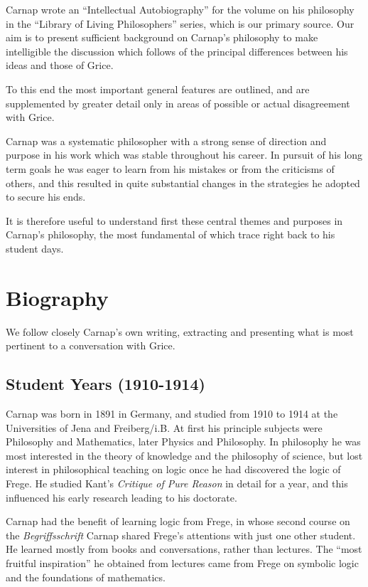 \documentclass[10pt,titlepage]{book}
\begin{document}
Carnap wrote an ``Intellectual Autobiography''\cite{carnap63} for the volume on his philosophy\cite{carnap63a} in the ``Library of Living Philosophers'' series, which is our primary source.
Our aim is to present sufficient background on Carnap's philosophy to make intelligible the discussion which follows of the principal differences between his ideas and those of Grice.

To this end the most important general features are outlined, and are supplemented by greater detail only in areas of possible or actual disagreement with Grice.

Carnap was a systematic philosopher with a strong sense of direction and purpose in his work which was stable throughout his career.
In pursuit of his long term goals he was eager to learn from his mistakes or from the criticisms of others, and this resulted in quite substantial changes in the strategies he adopted to secure his ends.

It is therefore useful to understand first these central themes and purposes in Carnap's philosophy, the most fundamental of which trace right back to his student days.

\section{Biography}

We follow closely Carnap's own writing, extracting and presenting what is most pertinent to a conversation with Grice.

\subsection{Student Years (1910-1914)}

Carnap was born in 1891 in Germany, and studied from 1910 to 1914 at the Universities of Jena and Freiberg/i.B.
At first his principle subjects were Philosophy and Mathematics, later Physics and Philosophy.
In philosophy he was most interested in the theory of knowledge and the philosophy of science, but lost interest in philosophical teaching on logic once he had discovered the logic of Frege.
He studied Kant's \emph{Critique of Pure Reason} in detail for a year, and this influenced his early research leading to his doctorate.

Carnap had the benefit of learning logic from Frege, in whose second course on the {\it Begriffsschrift} Carnap shared Frege's attentions with just one other student.
He learned mostly from books and conversations, rather than lectures.
The ``most fruitful inspiration'' he obtained from lectures came from Frege on symbolic logic and the foundations of mathematics.
\end{document}
